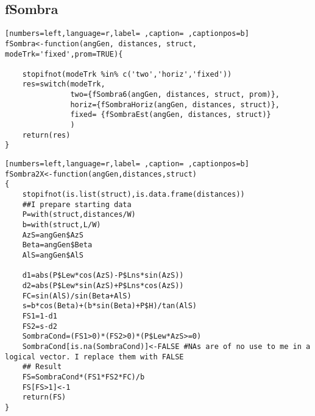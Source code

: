 \subsection{fSombra}
\label{sec:orgf292971}
\begin{lstlisting}[numbers=left,language=r,label= ,caption= ,captionpos=b]
fSombra<-function(angGen, distances, struct, modeTrk='fixed',prom=TRUE){

    stopifnot(modeTrk %in% c('two','horiz','fixed'))
    res=switch(modeTrk, 
               two={fSombra6(angGen, distances, struct, prom)},
               horiz={fSombraHoriz(angGen, distances, struct)},
               fixed= {fSombraEst(angGen, distances, struct)}
               )
    return(res)
}
\end{lstlisting}
\begin{lstlisting}[numbers=left,language=r,label= ,caption= ,captionpos=b]
fSombra2X<-function(angGen,distances,struct)
{
    stopifnot(is.list(struct),is.data.frame(distances))
    ##I prepare starting data	
    P=with(struct,distances/W)
    b=with(struct,L/W)
    AzS=angGen$AzS
    Beta=angGen$Beta
    AlS=angGen$AlS

    d1=abs(P$Lew*cos(AzS)-P$Lns*sin(AzS))
    d2=abs(P$Lew*sin(AzS)+P$Lns*cos(AzS))
    FC=sin(AlS)/sin(Beta+AlS)
    s=b*cos(Beta)+(b*sin(Beta)+P$H)/tan(AlS)
    FS1=1-d1
    FS2=s-d2
    SombraCond=(FS1>0)*(FS2>0)*(P$Lew*AzS>=0)
    SombraCond[is.na(SombraCond)]<-FALSE #NAs are of no use to me in a logical vector. I replace them with FALSE
    ## Result
    FS=SombraCond*(FS1*FS2*FC)/b
    FS[FS>1]<-1
    return(FS)
}	
\end{lstlisting}
